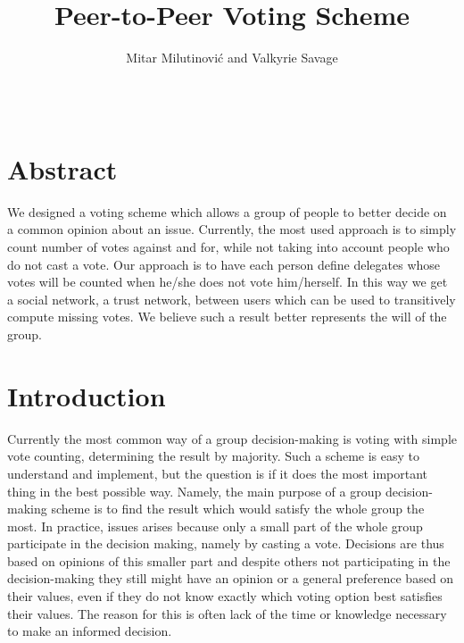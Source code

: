 \documentclass[a4paper]{acm_proc_article-sp}
\begin{document}
\title{Peer-to-Peer Voting Scheme}
\author{\alignauthor Mitar Milutinovi\'{c} and Valkyrie Savage\\
 \\
\\
} 
\maketitle

\setcounter{page}{1}

\section{Abstract}

We designed a voting scheme which allows a group of people to better decide on a common opinion about an issue. Currently,
the most used approach is to simply count number of votes against and for, while not taking into account people who do
not cast a vote. Our approach is to have each person define delegates whose votes will be counted when he/she does not
vote him/herself. In this way we get a social network, a trust network, between users which can be
used to transitively compute missing votes. We believe such a result better represents the will of the group.

\section{Introduction}

Currently the most common way of a group decision-making is voting with simple vote counting, determining the result by
majority. Such a scheme is easy to understand and implement, but the question is if it does the most important thing
in the best possible way. Namely, the main purpose of a group decision-making scheme is to find the result which would
satisfy the whole group the most. In practice, issues arises because only a small part of the whole group participate
in the decision making, namely by casting a vote. Decisions are thus based on opinions of this smaller part and despite
others not participating in the decision-making they still might have an opinion or a general preference based on their
values, even if they do not know exactly which voting option best satisfies their values. The reason for this is often
lack of the time or knowledge necessary to make an informed decision.
\end{document}
